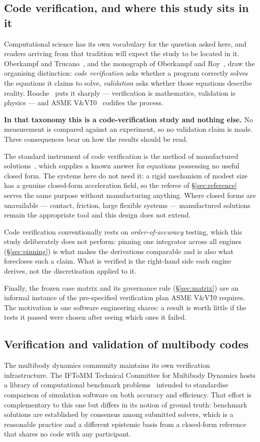 \documentclass[review,12pt]{elsarticle}
\begin{document}
\subsection{Code verification, and where this study sits in it}\label{sec:vv}
Computational science has its own vocabulary for the question asked here, and
readers arriving from that tradition will expect the study to be located in it.
Oberkampf and Trucano~\cite{oberkampf2002}, and the monograph of Oberkampf
and Roy~\cite{oberkampf2010}, draw the organising distinction: \emph{code
verification} asks whether a program correctly solves the equations it claims
to solve, \emph{validation} asks whether those equations describe reality.
Roache~\cite{roache1998} puts it sharply --- verification is mathematics,
validation is physics --- and ASME V\&V\~10~\cite{asmevv10} codifies the process.

\textbf{In that taxonomy this is a code-verification study and nothing else.} No
measurement is compared against an experiment, so no validation claim is made.
Three consequences bear on how the results should be read.

The standard instrument of code verification is the method of manufactured
solutions~\cite{roache2002}, which supplies a known answer for equations
possessing no useful closed form. The systems here do not need it: a rigid
mechanism of modest size has a genuine closed-form acceleration field, so the
referee of \S\ref{sec:reference} serves the same purpose without manufacturing
anything. Where closed forms are unavailable --- contact, friction, large
flexible systems --- manufactured solutions remain the appropriate tool and this
design does not extend.

Code verification conventionally rests on \emph{order-of-accuracy} testing,
which this study deliberately does not perform: pinning one integrator across
all engines (\S\ref{sec:pinning}) is what makes the derivations comparable
and is also what forecloses such a claim. What is verified is the right-hand
side each engine derives, not the discretisation applied to it.

Finally, the frozen case matrix and its governance rule (\S\ref{sec:matrix}) are
an informal instance of the pre-specified verification plan ASME V\&V\~10
requires. The motivation is one software engineering shares: a result is worth
little if the tests it passed were chosen after seeing which ones it failed.

\subsection{Verification and validation of multibody codes}
The multibody dynamics community maintains its own verification infrastructure.
The IFToMM Technical Committee for Multibody Dynamics hosts a library of
computational benchmark problems~\cite{iftomm} intended to standardise
comparison of simulation software on both accuracy and efficiency. That effort is
complementary to this one but differs in its notion of ground truth: benchmark
solutions are established by consensus among submitted solvers, which is a
reasonable practice and a different epistemic basis from a closed-form reference
that shares no code with any participant.
\end{document}
